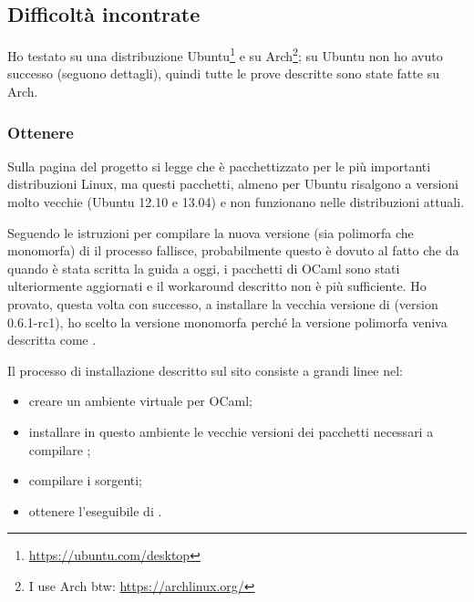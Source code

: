 \subsection{Difficoltà incontrate}
Ho testato \cduce su una distribuzione Ubuntu\footnote{\url{https://ubuntu.com/desktop}} e su Arch\footnote{I use Arch btw: \url{https://archlinux.org/}}; su Ubuntu non ho avuto successo (seguono dettagli), quindi tutte le prove descritte sono state fatte su Arch.
\subsubsection{Ottenere \cduce}
Sulla pagina del progetto si legge che \cduce è pacchettizzato per le più importanti distribuzioni Linux, ma questi pacchetti, almeno per Ubuntu risalgono a versioni molto vecchie (Ubuntu 12.10 e 13.04) e non funzionano nelle distribuzioni attuali.

Seguendo le istruzioni per compilare la nuova versione (sia polimorfa che monomorfa) di \cduce il processo fallisce, probabilmente questo è dovuto al fatto che da quando è stata scritta la guida a oggi, i pacchetti di OCaml sono stati ulteriormente aggiornati e il workaround descritto non è più sufficiente. Ho provato, questa volta con successo, a installare la vecchia versione di \cduce (version 0.6.1-rc1), ho scelto la versione monomorfa perché la versione polimorfa veniva descritta come .

Il processo di installazione descritto sul sito consiste a grandi linee nel:
\begin{itemize}
	\item creare un ambiente virtuale per OCaml;
	\item installare in questo ambiente le vecchie versioni dei pacchetti necessari a compilare \cduce;
	\item compilare i sorgenti;
	\item ottenere l'eseguibile di \cduce.
\end{itemize}
